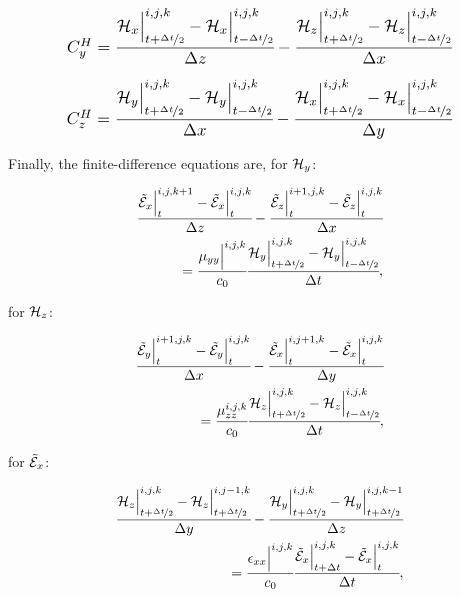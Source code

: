 \begin{align}
    \resizebox{.8\hsize}{!}{$
        \CHy = \cfrac{\Hht_x\Big|^{i,j,k}_{t+\nicefrac{\dt}{2}}-\Hht_x\Big|^{i,j,k}_{t-\nicefrac{\dt}{2}}}{\dz} - \cfrac{\Hht_z\Big|^{i,j,k}_{t+\nicefrac{\dt}{2}}-\Hht_z\Big|^{i,j,k}_{t-\nicefrac{\dt}{2}}}{\dx}
        \label{eq:CHy}
    $}
\end{align}


\begin{align}
    \resizebox{.8\hsize}{!}{$
        \CHz = \cfrac{\Hht_y\Big|^{i,j,k}_{t+\nicefrac{\dt}{2}}-\Hht_y\Big|^{i,j,k}_{t-\nicefrac{\dt}{2}}}{\dx} - \cfrac{\Hht_x\Big|^{i,j,k}_{t+\nicefrac{\dt}{2}}-\Hht_x\Big|^{i,j,k}_{t-\nicefrac{\dt}{2}}}{\dy}
        \label{eq:CHz}
    $}
\end{align}


Finally, the finite-difference equations are, for $\mathcal{H}_y$:

\begin{align}
    \cfrac{\tilde{\mathcal{E}}_x\Big|^{i,j,k+1}_{t}-\tilde{\mathcal{E}}_x\Big|^{i,j,k}_{t}}{\Delta z} - \cfrac{\tilde{\mathcal{E}}_z\Big|^{i+1,j,k}_{t}-\tilde{\mathcal{E}}_z\Big|^{i,j,k}_{t}}{\Delta x} \nonumber \\ 
    =\cfrac{\mu_{yy}\Big|^{i,j,k}}{c_0}\cfrac{\mathcal{H}_y\Big|^{i,j,k}_{t+\nicefrac{\Delta t}{2}} - \mathcal{H}_y\Big|^{i,j,k}_{t-\nicefrac{\Delta t}{2}}}{\Delta t},
    \label{eq:fd_hy}
\end{align}

for $\mathcal{H}_z$:

\begin{align}
    \cfrac{\tilde{\mathcal{E}}_y\Big|^{i+1,j,k}_{t}-\tilde{\mathcal{E}}_y\Big|^{i,j,k}_{t}}{\Delta x} - \cfrac{\tilde{\mathcal{E}}_x\Big|^{i,j+1,k}_{t}-\tilde{\mathcal{E}}_x\Big|^{i,j,k}_{t}}{\Delta y} \nonumber \\
    =\cfrac{\mu_{zz}^{i,j,k}}{c_0}\cfrac{\mathcal{H}_z\Big|^{i,j,k}_{t+\nicefrac{\Delta t}{2}} - \mathcal{H}_z\Big|^{i,j,k}_{t-\nicefrac{\Delta t}{2}}}{\Delta t},
    \label{eq:fd_hz}
\end{align}

for $\tilde{\mathcal{E}}_x$:

\begin{small}
    \begin{align}
        \cfrac{\mathcal{H}_z\Big|^{i,j,k}_{t+\nicefrac{\Delta t}{2}}-\mathcal{H}_z\Big|^{i,j-1,k}_{t+\nicefrac{\Delta t}{2}}}{\Delta y} - \cfrac{\mathcal{H}_y\Big|^{i,j,k}_{t+\nicefrac{\Delta t}{2}}-\mathcal{H}_y\Big|^{i,j,k-1}_{t+\nicefrac{\Delta t}{2}}}{\Delta z} \nonumber\\
        =
        \cfrac{\epsilon_{xx}\Big|^{i,j,k}}{c_0}\cfrac{\tilde{\mathcal{E}}_x\Big|^{i,j,k}_{t+\Delta t}-\tilde{\mathcal{E}}_x\Big|^{i,j,k}_{t}}{\Delta t},
        \label{eq:fd_ex}
    \end{align}  
\end{small}


